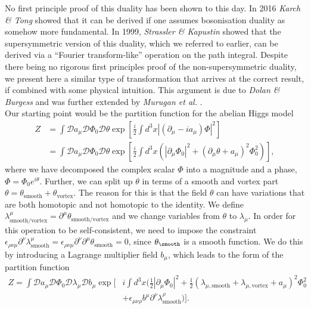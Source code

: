  No first principle proof of this duality has been shown to this day. In 2016 \textit{Karch \& Tong} \cite{Karch:2016sxi} showed that it can be derived if one assumes bosonisation duality as somehow more fundamental. In 1999, \textit{Strassler \& Kapustin} \cite{Kapustin:1999ha} showed that the supersymmetric version of this duality, which we referred to earlier, can be derived via a ``Fourier transform-like'' operation on the path integral. Despite there being no rigorous first principles proof of the non-supersymmetric duality, we present here a similar type of transformation that  arrives at the correct result, if combined with some physical intuition. This argument is due to \textit{Dolan \& Burgess} \cite{Burgess:2000kj} and was further extended by \textit{Murugan et al.} \cite{Murugan:2014sfa} .  \\
\indent Our starting point would be the partition function for the abelian Higgs model
\begin{align}
    Z&= \int \mathcal{D}a_{\mu} \mathcal{D}\Phi_0 \mathcal{D} \theta \exp\left[\frac{i}{2} \int d^3x |(\partial_{\mu} -i a_{\mu}) \Phi |^2 \right]\\
    &= \int \mathcal{D}a_{\mu} \mathcal{D}\Phi_0 \mathcal{D} \theta \exp\left[ \frac{i}{2} \int d^3x \left( |\partial_{\mu}\Phi_0 |^2 + \left(\partial_{\mu}\theta +  a_{\mu} \right)^2\Phi_0^2 \right) \right],
\end{align}
where we have decomposed the complex scalar $\Phi$ into a magnitude and a phase, $\Phi = \Phi_0 e^{i \theta}$. Further, we can split up $\theta$ in terms of a smooth and vortex part $\theta = \theta_{\text{smooth}} + \theta_{\text{vortex}}$. The reason for this is that the field $\theta$ can have variations that are both homotopic and not homotopic to the identity.  We define $\lambda^{\mu}_{\text{smooth/vortex}} =\partial^{\mu} \theta_{\text{smooth/vortex}}$ and we change variables from $\theta$ to $\lambda_{\mu}$. In order for this operation to be self-consistent, we need to impose the constraint $\epsilon_{\rho \nu \mu} \partial^{\nu} \lambda^{\mu}_{\text{smooth}}=\epsilon_{\rho \nu \mu} \partial^{\nu} \partial^{\mu} \theta_{\text{smooth}}=0$, since $\theta_{\text{\smooth}}$ is a smooth function. We do this by introducing a Lagrange multiplier field $b_{\mu}$, which leads to the form of the partition function
\begin{align}
    Z= \int \mathcal{D}a_{\mu} \mathcal{D}\Phi_0 \mathcal{D} \lambda_{\mu} \mathcal{D} b_{\mu} \exp\bigg[&i \int d^3x \bigg( \frac{1}{2}|\partial_{\mu}\Phi_0 |^2 + \frac{1}{2}\left(\lambda_{\mu,\text{smooth}}+\lambda_{\mu,\text{vortex}} +  a_{\mu} \right)^2\Phi_0^2 \nonumber \\
    &+ \epsilon_{\mu \nu \rho} b^{\mu} \partial^{\nu} \lambda^{\rho}_{\text{smooth}} \bigg) \bigg].
\end{align}
